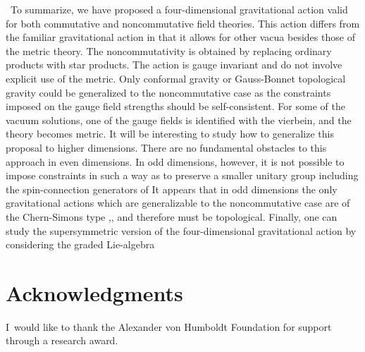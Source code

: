 \documentclass[a4paper,a4paper]{article}
\begin{document}
\ To summarize, we have proposed a four-dimensional gravitational action valid
for both commutative and noncommutative field theories. This action differs
from the familiar gravitational action in that it allows for other vacua
besides those of the metric theory. The noncommutativity is obtained by
replacing ordinary products with star products. The action is gauge invariant
and do not involve explicit use of the metric. Only conformal gravity or
Gauss-Bonnet topological gravity could be generalized to the noncommutative
case as the constraints imposed on the gauge field strengths should be
self-consistent. For some of the vacuum solutions, one of the gauge fields is
identified with the vierbein, and the theory becomes metric. It will be
interesting to study how to generalize this proposal to higher dimensions.
There are no fundamental obstacles to this approach in even dimensions. In odd
dimensions, however, it is not possible to impose constraints in such a way as
to preserve a smaller unitary group including the spin-connection generators
of \coordHE{} It appears that in odd dimensions the only gravitational
actions which are generalizable to the noncommutative case are of the
Chern-Simons type \cite{CF},\cite{poly}, and therefore must be topological.
Finally, one can study the supersymmetric version of the four-dimensional
gravitational action by considering the graded Lie-algebra \coordHE{}

\section{Acknowledgments}

I\ would like to thank the Alexander von Humboldt Foundation for support
through a research award.
\end{document}
